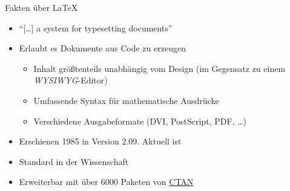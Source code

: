 \documentclass[aspectratio=169]{beamer}
\providecommand{\tightlist}{\setlength{\itemsep}{0pt}\setlength{\parskip}{0pt}}
\newcommand\citestyle[1]{\textcolor{foreground-secondary}{\textsuperscript{#1}}}
\let\oldautocite\autocite
\renewcommand{\autocite}[1]{\citestyle{\oldautocite{#1}}}
\begin{document}
    \begin{frame}{Fakten über \LaTeX}
    \protect\hypertarget{fakten-uxfcber}{}
    \begin{itemize}
    \tightlist
    \item
      \enquote{[\ldots] a system for typesetting documents}\autocite{latex}
    \item
      Erlaubt es Dokumente aus Code zu erzeugen\autocite{latex}

      \begin{itemize}
      \tightlist
      \item
        Inhalt größtenteils unabhängig vom Design (im Gegensatz zu einem
        \emph{WYSIWYG}-Editor)\autocite{latex}
      \item
        Umfassende Syntax für mathematische Ausdrücke\autocite{latex}
      \item
        Verschiedene Ausgabeformate (DVI\autocite{latex},
        PostScript\autocite{ctan-dvips}, PDF\autocite{ctan-dvipdfmx},
        \ldots)
      \end{itemize}
    \item
      Erschienen 1985 in Version 2.09. Aktuell ist
      \autocite{latex}
    \item
      Standard in der Wissenschaft \autocite{latex}
    \item
      Erweiterbar mit über 6000 Paketen von
      \href{https://ctan.org}{\alert{\underline{CTAN}}}\autocite{ctan}
    \end{itemize}
    \end{frame}
\end{document}

